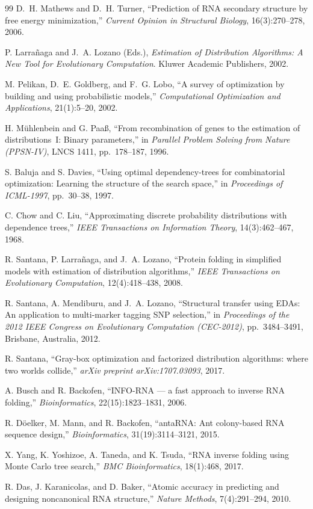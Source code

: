 \documentclass[11pt,a4paper]{article}
\begin{document}
\begin{thebibliography}{99}
D.~H. Mathews and D.~H. Turner,
``Prediction of RNA secondary structure by free energy minimization,''
\emph{Current Opinion in Structural Biology}, 16(3):270--278, 2006.

P. Larra\~naga and J.~A. Lozano (Eds.),
\emph{Estimation of Distribution Algorithms: A New Tool for Evolutionary Computation}.
Kluwer Academic Publishers, 2002.

M. Pelikan, D.~E. Goldberg, and F.~G. Lobo,
``A survey of optimization by building and using probabilistic models,''
\emph{Computational Optimization and Applications}, 21(1):5--20, 2002.

H. M\"uhlenbein and G. Paa\ss,
``From recombination of genes to the estimation of distributions~I: Binary parameters,''
in \emph{Parallel Problem Solving from Nature (PPSN-IV)}, LNCS 1411, pp.~178--187, 1996.

S. Baluja and S. Davies,
``Using optimal dependency-trees for combinatorial optimization: Learning the structure of the search space,''
in \emph{Proceedings of ICML-1997}, pp.~30--38, 1997.

C. Chow and C. Liu,
``Approximating discrete probability distributions with dependence trees,''
\emph{IEEE Transactions on Information Theory}, 14(3):462--467, 1968.

R. Santana, P. Larra\~naga, and J.~A. Lozano,
``Protein folding in simplified models with estimation of distribution algorithms,''
\emph{IEEE Transactions on Evolutionary Computation}, 12(4):418--438, 2008.

R. Santana, A. Mendiburu, and J.~A. Lozano,
``Structural transfer using EDAs: An application to multi-marker tagging SNP selection,''
in \emph{Proceedings of the 2012 IEEE Congress on Evolutionary Computation (CEC-2012)},
pp.~3484--3491, Brisbane, Australia, 2012.

R. Santana,
``Gray-box optimization and factorized distribution algorithms: where two worlds collide,''
\emph{arXiv preprint arXiv:1707.03093}, 2017.

A. Busch and R. Backofen,
``{INFO-RNA} --- a fast approach to inverse RNA folding,''
\emph{Bioinformatics}, 22(15):1823--1831, 2006.

R. D\"oelker, M. Mann, and R. Backofen,
``{antaRNA}: Ant colony-based RNA sequence design,''
\emph{Bioinformatics}, 31(19):3114--3121, 2015.

X. Yang, K. Yoshizoe, A. Taneda, and K. Tsuda,
``{RNA} inverse folding using Monte Carlo tree search,''
\emph{BMC Bioinformatics}, 18(1):468, 2017.

R. Das, J. Karanicolas, and D. Baker,
``Atomic accuracy in predicting and designing noncanonical RNA structure,''
\emph{Nature Methods}, 7(4):291--294, 2010.

\end{thebibliography}
\end{document}
